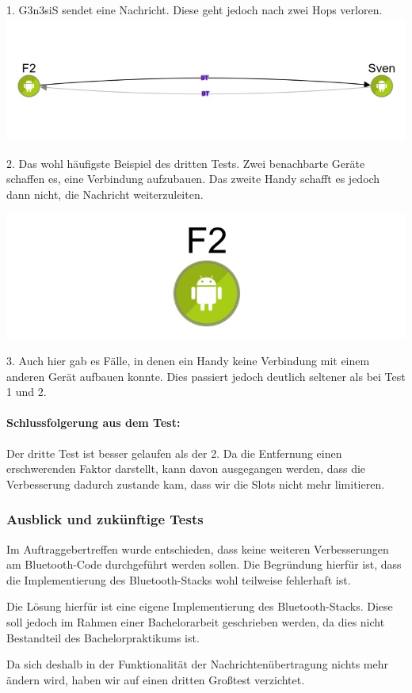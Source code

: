 1. G3n3siS sendet eine Nachricht. Diese geht jedoch nach zwei Hops verloren.\\

\includegraphics[width=1.0\textwidth]{belege/grosstests/Bilder/Grosstest2/Test3Misserfolg2.jpg}

2. Das wohl häufigste Beispiel des dritten Tests. Zwei benachbarte Geräte
schaffen es, eine Verbindung aufzubauen. Das zweite Handy schafft es
jedoch dann nicht, die Nachricht weiterzuleiten.

\includegraphics[width=1.0\textwidth]{belege/grosstests/Bilder/Grosstest2/Test3Misserfolg3.jpg}

3. Auch hier gab es Fälle, in denen ein Handy keine Verbindung mit einem anderen Gerät aufbauen konnte. Dies passiert jedoch deutlich seltener als bei Test 1 und 2.

\paragraph{Schlussfolgerung aus dem Test:}

Der dritte Test ist besser gelaufen als der 2. Da die Entfernung einen
erschwerenden Faktor darstellt, kann davon ausgegangen werden, dass die
Verbesserung dadurch zustande kam, dass wir die Slots nicht mehr
limitieren.

\subsubsection{Ausblick und zukünftige Tests}

Im Auftraggebertreffen wurde entschieden, dass keine weiteren
Verbesserungen am Bluetooth-Code durchgeführt werden sollen. Die Begründung
hierfür ist, dass die Implementierung des Bluetooth-Stacks wohl
teilweise fehlerhaft ist.

Die Lösung hierfür ist eine eigene Implementierung des Bluetooth-Stacks.
Diese soll jedoch im Rahmen einer Bachelorarbeit geschrieben werden, da
dies nicht Bestandteil des Bachelorpraktikums ist.

Da sich deshalb in der Funktionalität der Nachrichtenübertragung nichts
mehr ändern wird, haben wir auf einen dritten Großtest verzichtet.
